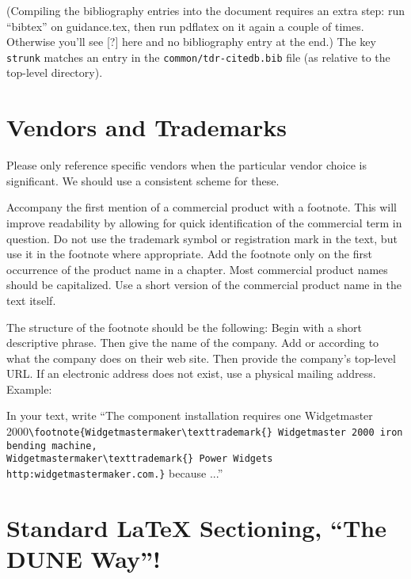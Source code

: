 (Compiling the bibliography entries into the document requires an extra step: run ``bibtex'' on
 guidance.tex, then run pdflatex on it again a couple of times. Otherwise you'll see [?] here 
 and no bibliography entry at the end.) 
The key \texttt{strunk} matches an entry in the \texttt{common/tdr-citedb.bib}
file (as relative to the top-level directory).

\section{Vendors and Trademarks}
\label{sec:trademarks}

Please only reference specific vendors when the particular vendor choice is significant. 
We should use a consistent scheme for these. 
 
Accompany the first mention of a commercial product with a footnote.  This will improve readability by allowing for quick identification of the commercial term in question. 
Do not use the trademark symbol \texttrademark{} or registration mark \textregistered{} in the text, but use it in the footnote where appropriate. Add the footnote only on the first occurrence of the product name in a chapter.
Most commercial product names should be capitalized.
Use a short version of the commercial product name in the text itself.
 
The structure of the footnote should be the following:
Begin with a short descriptive phrase.  Then give the name of the company.  Add \texttrademark{} or  \textregistered{} according to what the company does on their web site. Then provide the company's top-level URL. If an electronic address does not exist, use a physical mailing address. Example:

In your text, write ``The component installation requires one Widgetmaster \\
2000\verb|\footnote{Widgetmastermaker\texttrademark{} Widgetmaster 2000 iron bending machine, | \\
\verb|Widgetmastermaker\texttrademark{} Power Widgets http:widgetmastermaker.com.}| because ...''

\section{Standard \LaTeX{} Sectioning, ``The DUNE Way''!}
\label{sec:latex-sectioning}


